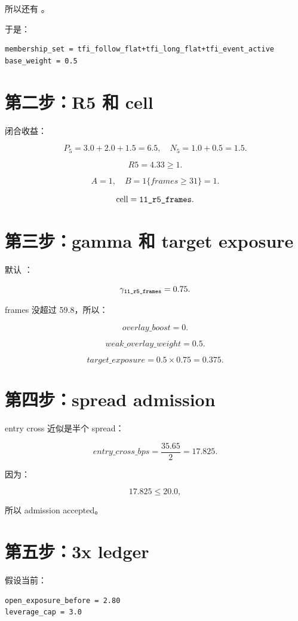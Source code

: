 所以还有 。

于是：

\begin{lstlisting}
membership_set = tfi_follow_flat+tfi_long_flat+tfi_event_active
base_weight = 0.5
\end{lstlisting}

\section{第二步：R5 和 cell}

闭合收益：

\[
P_5=3.0+2.0+1.5=6.5,\quad
N_5=1.0+0.5=1.5.
\]

\[
R5=4.33\ge1.
\]

\[
A=1,\quad B=1\{frames\ge31\}=1.
\]

\[
\text{cell}=\text{\ttfamily 11\_r5\_frames}.
\]

\section{第三步：gamma 和 target exposure}

默认 ：

\[
\gamma_{\text{\ttfamily 11\_r5\_frames}}=0.75.
\]

frames 没超过 59.8，所以：

\[
overlay\_boost=0.
\]

\[
weak\_overlay\_weight=0.5.
\]

\[
target\_exposure=0.5\times0.75=0.375.
\]

\section{第四步：spread admission}

entry cross 近似是半个 spread：

\[
entry\_cross\_bps=\frac{35.65}{2}=17.825.
\]

因为：

\[
17.825 \le 20.0,
\]

所以 admission accepted。

\section{第五步：3x ledger}

假设当前：

\begin{lstlisting}
open_exposure_before = 2.80
leverage_cap = 3.0
\end{lstlisting}

